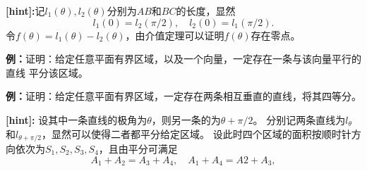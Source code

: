 \begin{center}
\end{center}

{\bf [hint]:}记$l_1(\theta),l_2(\theta)$分别为$AB$和$BC$的长度，显然
$$l_1(0)=l_2(\pi/2),\quad l_2(0)=l_1(\pi/2).$$
令$f(\theta)=l_1(\theta)-l_2(\theta)$，由介值定理可以证明$f(\theta)$存在零点。

{\bf 例：}证明：给定任意平面有界区域，以及一个向量，一定存在一条与该向量平行的直线
平分该区域。

{\bf 例：}证明：给定任意平面有界区域，一定存在两条相互垂直的直线，将其四等分。

{\bf [hint]:} 设其中一条直线的极角为$\theta$，则另一条的为$\theta+\pi/2$。
分别记两条直线为$l_{\theta}$和$l_{\theta+\pi/2}$，显然可以使得二者都平分给定区域。
设此时四个区域的面积按顺时针方向依次为$S_1,S_2,S_3,S_4$，且由平分可满足
$$A_1+A_2=A_3+A_4,\quad A_1+A_4=A2+A_3,$$

